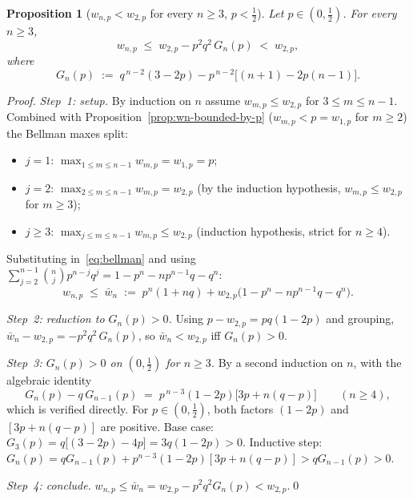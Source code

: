 \documentclass{article}
\newtheorem{proposition}{Proposition}
\theoremstyle{definition}
\theoremstyle{remark}
\begin{document}
\begin{proposition}[$w_{n,p}<w_{2,p}$ for every $n\ge 3$, $p<\tfrac12$]\label{prop:wn-bounded-by-w2}
Let $p\in(0,\tfrac12)$. For every $n\ge 3$,
\begin{equation}\label{eq:wn-bound2}
  w_{n,p}\;\le\;w_{2,p}-p^{2}q^{2}\,G_{n}(p)\;<\;w_{2,p},
\end{equation}
where
\begin{equation}\label{eq:Gn-def}
  G_{n}(p)\;:=\;q^{\,n-2}(3-2p)-p^{\,n-2}\bigl[(n+1)-2p(n-1)\bigr].
\end{equation}
\end{proposition}

\begin{proof}
\emph{Step~1: setup.} By induction on $n$ assume $w_{m,p}\le w_{2,p}$
for $3\le m\le n-1$. Combined with
Proposition~\ref{prop:wn-bounded-by-p} ($w_{m,p}<p=w_{1,p}$ for
$m\ge 2$) the Bellman maxes split:
\begin{itemize}
  \item $j=1$: $\max_{1\le m\le n-1}w_{m,p}=w_{1,p}=p$;
  \item $j=2$: $\max_{2\le m\le n-1}w_{m,p}=w_{2,p}$ (by the induction
        hypothesis, $w_{m,p}\le w_{2,p}$ for $m\ge 3$);
  \item $j\ge 3$: $\max_{j\le m\le n-1}w_{m,p}\le w_{2,p}$ (induction
        hypothesis, strict for $n\ge 4$).
\end{itemize}
Substituting in~\eqref{eq:bellman} and using
$\sum_{j=2}^{n-1}\binom{n}{j}p^{n-j}q^{j}=1-p^n-np^{n-1}q-q^n$:
\[
  w_{n,p}\;\le\;\bar w_n\;:=\;p^n(1+nq)+w_{2,p}\bigl(1-p^n-np^{n-1}q-q^n\bigr).
\]

\emph{Step~2: reduction to $G_{n}(p)>0$.} Using
$p-w_{2,p}=pq(1-2p)$ and grouping,
$\bar w_n-w_{2,p}=-p^{2}q^{2}\,G_{n}(p)$, so $\bar w_n<w_{2,p}$
iff $G_n(p)>0$.

\emph{Step~3: $G_{n}(p)>0$ on $(0,\tfrac12)$ for $n\ge 3$.} By a
second induction on $n$, with the algebraic identity
\begin{equation}\label{eq:Gn-rec}
  G_{n}(p)-q\,G_{n-1}(p)\;=\;p^{\,n-3}(1-2p)\bigl[3p+n(q-p)\bigr]
  \qquad(n\ge 4),
\end{equation}
which is verified directly. For $p\in(0,\tfrac12)$, both factors
$(1-2p)$ and $[3p+n(q-p)]$ are positive. Base case:
$G_{3}(p)=q\bigl[(3-2p)-4p\bigr]=3q(1-2p)>0$. Inductive step:
$G_{n}(p)=qG_{n-1}(p)+p^{n-3}(1-2p)[3p+n(q-p)]>qG_{n-1}(p)>0$.

\emph{Step~4: conclude.} $w_{n,p}\le\bar w_{n}=w_{2,p}-p^{2}q^{2}G_{n}(p)<w_{2,p}$.\qed
\end{proof}
\end{document}
